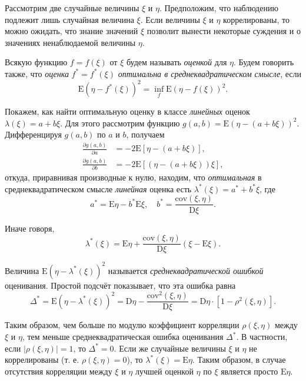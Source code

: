 \documentclass[11pt,a4paper]{article}
\begin{document}
Рассмотрим две случайные величины \(\xi\) и \(\eta\). Предположим, что
наблюдению подлежит лишь случайная величина \(\xi\). Если величины
\(\xi\) и \(\eta\) коррелированы, то можно ожидать, что знание значений
\(\xi\) позволит вынести некоторые суждения и о значениях ненаблюдаемой
величины \(\eta\).

Всякую функцию \(f = f(\xi)\) от \(\xi\) будем называть \emph{оценкой}
для \(\eta\). Будем говорить также, что \emph{оценка}
\(f^\ast = f^\ast(\xi)\) \emph{оптимальна в среднеквадратическом
смысле}, если
\[ \mathrm{E}(\eta − f^\ast(\xi))^2 = \inf_f \mathrm{E}(\eta − f(\xi))^2. \]

Покажем, как найти оптимальную оценку в классе \emph{линейных} оценок
\(\lambda(\xi) = a + b\xi\). Для этого рассмотрим функцию
\(g(a, b) = \mathrm{E}(\eta − (a+b\xi))^2\). Дифференцируя \(g(a, b)\)
по \(a\) и \(b\), получаем \[
\begin{split}
    \frac{\partial g(a, b)}{\partial a} &= −2 \mathrm{E} \left[ \eta − (a+b\xi) \right], \\
    \frac{\partial g(a, b)}{\partial b} &= −2 \mathrm{E} \left[ (\eta − (a+b\xi))\xi \right],
\end{split}
\] откуда, приравнивая производные к нулю, находим, что
\emph{оптимальная} в среднеквадратическом смысле \emph{линейная} оценка
есть \(\lambda^\ast (\xi) = a^\ast + b^\ast \xi\), где \[
    a^\ast = \mathrm{E}\eta − b^\ast\mathrm{E}\xi, \quad b^\ast = \frac{\mathrm{cov}(\xi, \eta)}{\mathrm{D}\xi}.
\]

Иначе говоря, \[
    \lambda^\ast(\xi) = \mathrm{E}\eta + \frac{\mathrm{cov}(\xi, \eta)}{\mathrm{D}\xi} (\xi - \mathrm{E}\xi).
\]

Величина \(\mathrm{E}(\eta − \lambda^\ast(\xi))^2\) называется
\emph{среднеквадратической ошибкой} оценивания. Простой подсчёт
показывает, что эта ошибка равна \[
\Delta^\ast = \mathrm{E}(\eta − \lambda^\ast(\xi))^2 = \mathrm{D}\eta − \frac{\mathrm{cov}^2(\xi, \eta)}{\mathrm{D}\xi} = \mathrm{D}\eta \cdot [1 - \rho^2(\xi, \eta)].
\]

Таким образом, чем больше по модулю коэффициент корреляции
\(\rho(\xi, \eta)\) между \(\xi\) и \(\eta\), тем меньше
среднеквадратическая ошибка оценивания \(\Delta^\ast\). В частности,
если \(|\rho(\xi, \eta)|=1\), то \(\Delta^\ast = 0\). Если же случайные
величины \(\xi\) и \(\eta\) не коррелированы (т. е.
\(\rho(\xi, \eta)=0\)), то \(\lambda^\ast(\xi) = \mathrm{E}\eta\). Таким
образом, в случае отсутствия корреляции между \(\xi\) и \(\eta\) лучшей
оценкой \(\eta\) по \(\xi\) является просто \(\mathrm{E}\eta\).
\end{document}
